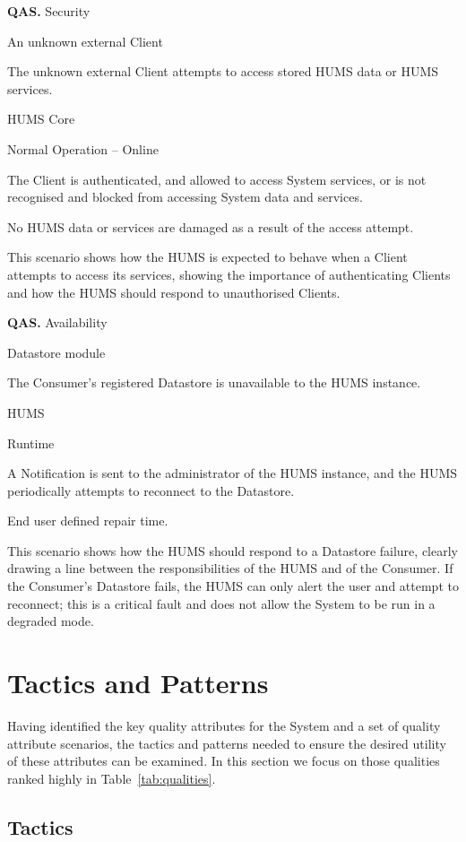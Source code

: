\documentclass[10pt,a4paper]{article}
\newcommand{\qas}[1]{\textcolor{reqColor}{\textbf{QAS.#1}}}
\newenvironment{scenario}[1]{
\newcommand{\source}[1]{\item[Source of Stimulus:] ##1}
\newcommand{\stimulus}[1]{\item[Stimulus:] ##1}
\newcommand{\artifact}[1]{\item[Artifact:] ##1}
\newcommand{\environment}[1]{\item[Environment:] ##1}
\newcommand{\response}[1]{\item[Response:] ##1}
\newcommand{\measure}[1]{\item[Response Measure:] ##1}
\newcommand{\rationale}[1]{\item[Scenario Rationale:] ##1}
\newcommand{\quality}[1]{\item[Quality:] ##1}
		\begin{description} [noitemsep]	
		\item[Scenario ID:] \qas{#1}
		}{\end{description} \vspace*{0.3cm}
		}
\begin{document}
\begin{scenario}{3}
\quality{Security}
\source{An unknown external Client}
\stimulus{The unknown external Client attempts to access stored HUMS data or HUMS services.}
\artifact{HUMS Core}
\environment{Normal Operation -- Online}
\response{The Client is authenticated, and allowed to access System services, or is not recognised and blocked from accessing System data and services.}
\measure{No HUMS data or services are damaged as a result of the access attempt.}
\rationale{This scenario shows how the HUMS is expected to behave when a Client attempts to access its services, showing the importance of authenticating Clients and how the HUMS should respond to unauthorised Clients.}
\end{scenario}

\begin{scenario}{4}
\quality{Availability}
\source{Datastore module}
\stimulus{The Consumer's registered Datastore is unavailable to the HUMS instance.}
\artifact{HUMS}
\environment{Runtime}
\response{A Notification is sent to the administrator of the HUMS instance, and the HUMS periodically attempts to reconnect to the Datastore.}
\measure{End user defined repair time.}
\rationale{This scenario shows how the HUMS should respond to a Datastore failure, clearly drawing a line between the responsibilities of the HUMS and of the Consumer. If the Consumer's Datastore fails, the HUMS can only alert the user and attempt to reconnect; this is a critical fault and does not allow the System to be run in a degraded mode.}
\end{scenario}



\section{Tactics and Patterns}
\label{sec:tactics}
Having identified the key quality attributes for the System and a set of quality attribute scenarios, the tactics and patterns needed to ensure the desired utility of these attributes can be examined. In this section we focus on those qualities ranked highly in Table~\ref{tab:qualities}.

\subsection{Tactics}
\end{document}
